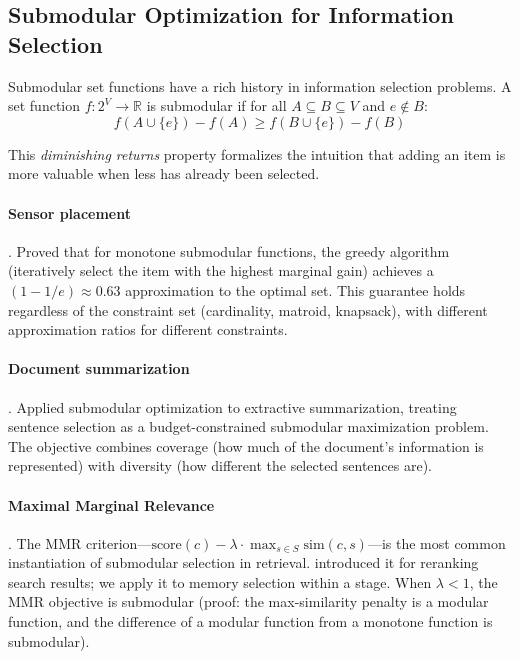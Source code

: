 \documentclass[11pt]{article}
\begin{document}
\subsection{Submodular Optimization for Information Selection}
\label{sec:submodular-background}

Submodular set functions have a rich history in information selection
problems.  A set function $f: 2^V \to \mathbb{R}$ is submodular if
for all $A \subseteq B \subseteq V$ and $e \notin B$:
\begin{equation}
f(A \cup \{e\}) - f(A) \geq f(B \cup \{e\}) - f(B)
\label{eq:submodular}
\end{equation}

This \emph{diminishing returns} property formalizes the intuition that
adding an item is more valuable when less has already been selected.

\paragraph{Sensor placement} \citep{Krause2008}.
Proved that for monotone submodular functions, the greedy algorithm
(iteratively select the item with the highest marginal gain) achieves
a $(1 - 1/e) \approx 0.63$ approximation to the optimal set.  This
guarantee holds regardless of the constraint set (cardinality,
matroid, knapsack), with different approximation ratios for different
constraints.

\paragraph{Document summarization} \citep{Lin2011}.
Applied submodular optimization to extractive summarization, treating
sentence selection as a budget-constrained submodular maximization
problem.  The objective combines coverage (how much of the document's
information is represented) with diversity (how different the selected
sentences are).

\paragraph{Maximal Marginal Relevance} \citep{Carbonell1998}.
The MMR criterion---$\text{score}(c) - \lambda \cdot \max_{s \in S}
\text{sim}(c, s)$---is the most common instantiation of submodular
selection in retrieval.  \citet{Carbonell1998} introduced it for
reranking search results; we apply it to memory selection within a
stage.  When $\lambda < 1$, the MMR objective is submodular (proof:
the max-similarity penalty is a modular function, and the difference
of a modular function from a monotone function is submodular).
\end{document}
